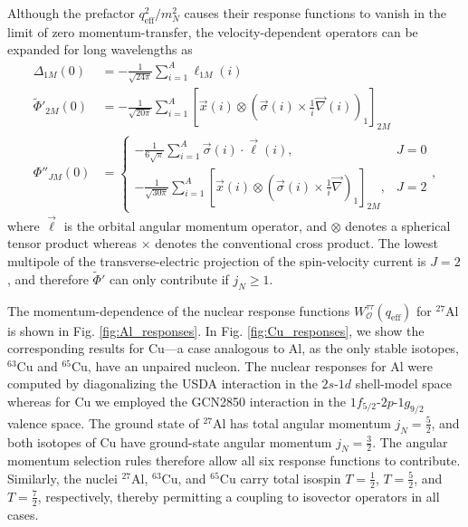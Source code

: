 \documentclass{book}[letterpaper,12pt]
\begin{document}
Although the prefactor $q_\mathrm{eff}^2/m_N^2$ causes their response functions to vanish in the limit of zero momentum-transfer, the velocity-dependent operators can be expanded for long wavelengths as
\begin{equation}
\begin{split}
\Delta_{1M}(0)&=-\frac{1}{\sqrt{24\pi}}\sum_{i=1}^A\ell_{1M}(i)\\
\tilde{\Phi}'_{2M}(0)&=-\frac{1}{\sqrt{20\pi}}\sum_{i=1}^A\left[\vec{x}(i)\otimes\left(\vec{\sigma}(i)\times\frac{1}{i}\vec{\nabla}(i)\right)_1\right]_{2M}\\
\Phi''_{JM}(0)&=\left\{\begin{array}{cc}
-\frac{1}{6\sqrt{\pi}}\sum_{i=1}^A\vec{\sigma}(i)\cdot\vec{\ell}(i), & J=0\\
-\frac{1}{\sqrt{30\pi}}\sum_{i=1}^A\left[\vec{x}(i)\otimes\left(\vec{\sigma}(i)\times\frac{1}{i}\vec{\nabla}\right)_1\right]_{2M}, & J=2
\end{array}\right.,
\end{split}
\end{equation}
where $\vec{\ell}$ is the orbital angular momentum operator, and $\otimes$ denotes a spherical tensor product whereas $\times$ denotes the conventional cross product. The lowest multipole of the transverse-electric projection of the spin-velocity current is $J=2$, and therefore $\tilde{\Phi}'$ can only contribute if $j_N\geq 1$.

The momentum-dependence of the nuclear response functions $W^{\tau\tau}_\mathcal{O}(q_\mathrm{eff})$ for $^{27}$Al is shown in Fig. \ref{fig:Al_responses}. In Fig. \ref{fig:Cu_responses}, we show the corresponding results for Cu---a case analogous to Al, as the only stable isotopes, $^{63}$Cu and $^{65}$Cu, have an unpaired nucleon. The nuclear responses for Al were computed by diagonalizing the USDA interaction in the $2s$-$1d$ shell-model space whereas for Cu we employed the GCN2850 interaction in the $1f_{5/2}$-$2p$-$1g_{9/2}$ valence space. The ground state of $^{27}$Al has total angular momentum $j_N=\frac{5}{2}$, and both isotopes of Cu have ground-state angular momentum $j_N=\frac{3}{2}$. The angular momentum selection rules therefore allow all six response functions to contribute. Similarly, the nuclei $^{27}$Al, $^{63}$Cu, and $^{65}$Cu carry total isospin $T=\frac{1}{2}$, $T=\frac{5}{2}$, and $T=\frac{7}{2}$, respectively, thereby permitting a coupling to isovector operators in all cases.
\end{document}
